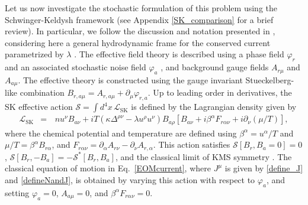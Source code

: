 \documentclass[aps,prd,nofootinbib,amsmath,amssymb,showpacs,longbibliography,singlecolumn,superscriptaddress,notitlepage]{revtex4-1}
\theoremstyle{plain}
\theoremstyle{definition}
\begin{document}
Let us now investigate the stochastic formulation of this problem using the Schwinger-Keldysh framework \cite{Liu:2018kfw} (see Appendix \ref{SK_comparison} for a brief review). In particular, we follow the discussion and notation presented in \cite{Jain:2020zhu}, considering here a general hydrodynamic frame for the conserved current parametrized by $\lambda$ \cite{Hoult:2020eho}. The effective field theory is described using a phase field $\varphi_r$ and an associated stochastic noise field $\varphi_a$ \cite{Glorioso:2017fpd}, and background gauge fields $A_{r\mu}$ and $A_{a\mu}$. The effective theory is constructed using the gauge invariant Stueckelberg-like combination $B_{r,a\mu} = A_{r,a\mu}+\partial_{\mu}\varphi_{r,a}$. Up to leading order in derivatives, the SK effective action $\mathcal{S} = \int d^4 x\,\mathcal{L}_{\mathrm{SK}}$ is defined by the Lagrangian density given by
\begin{eqnarray} \label{U1_action_firstorder}
    \mathcal{L}_{\mathrm{SK}} & = &\, n u^{\nu} B_{a\nu}  + i T \left(\kappa \Delta^{\rho\nu}-\lambda u^\rho u^\nu\right)B_{a\rho}\left[B_{a\nu} + i \beta^\alpha F_{r \alpha\nu}+i\partial_\nu (\mu/T)\right],
\end{eqnarray}
where the chemical potential and temperature are defined using $\beta^\alpha = u^\alpha/T$ and $\mu/T = \beta^\alpha B_{r\alpha}$, and $F_{r\alpha\nu} = \partial_\alpha A_{r\nu}-\partial_\nu A_{r,\alpha}$. This action satisfies $\mathcal{S}[B_r,B_a=0]=0$, $\mathcal{S}[B_r,-B_a]=-\mathcal{S}^*[B_r,B_a]$, and the classical limit of KMS symmetry \cite{Jain:2020zhu}. The classical equation of motion in Eq.\ \eqref{EOMcurrent}, where $J^\mu$ is given by  \eqref{define_J} and \eqref{defineNandJ}, is obtained by varying this action with respect to $\varphi_a$, and setting $\varphi_a=0$, $A_{a\mu}=0$, and $\beta^\alpha F_{r\alpha \nu}=0$. 
\end{document}
